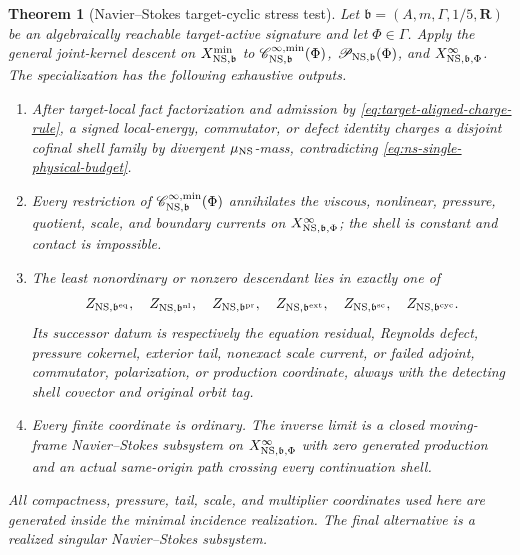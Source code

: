 \documentclass[11pt]{article}
\numberwithin{section}{part}
\theoremstyle{plain}
\newtheorem{theorem}{Theorem}[section]
\theoremstyle{definition}
\theoremstyle{remark}
\begin{document}
\begin{theorem}[Navier--Stokes target-cyclic stress test]
\label{thm:ns-target-cyclic-stress-test}
Let \(\mathfrak b=(A,m,\Gamma,1/5,\mathbf R)\) be an algebraically reachable
target-active signature and let \(\Phi\in\Gamma\).
Apply the general joint-kernel descent on
\(X^{\min}_{{\rm NS},\mathfrak b}\) to
\(\mathscr C^{\infty,\min}_{{\rm NS},\mathfrak b}(\Phi)\),
\(\mathscr P_{{\rm NS},\mathfrak b}(\Phi)\), and
\(X^\infty_{{\rm NS},\mathfrak b,\Phi}\).  The specialization has the following
exhaustive outputs.
\begin{enumerate}[label=\textup{(S\arabic*)}]
\item After target-local fact factorization and admission by
\eqref{eq:target-aligned-charge-rule}, a signed local-energy, commutator, or
defect identity charges a disjoint cofinal shell family by divergent
\(\mu_{\rm NS}\)-mass, contradicting
\eqref{eq:ns-single-physical-budget}.
\item Every restriction of
\(\mathscr C^{\infty,\min}_{{\rm NS},\mathfrak b}(\Phi)\) annihilates the viscous, nonlinear,
pressure, quotient, scale, and boundary currents on
\(X^\infty_{{\rm NS},\mathfrak b,\Phi}\); the shell is constant and contact is impossible.
\item The least nonordinary or nonzero descendant lies in exactly one of
\[
 Z_{{\rm NS},\mathfrak b^{\rm eq}},\quad
 Z_{{\rm NS},\mathfrak b^{\rm nl}},\quad
 Z_{{\rm NS},\mathfrak b^{\rm pr}},\quad
 Z_{{\rm NS},\mathfrak b^{\rm ext}},\quad
 Z_{{\rm NS},\mathfrak b^{\rm sc}},\quad
 Z_{{\rm NS},\mathfrak b^{\rm cyc}}.
\]
Its successor datum is respectively the equation residual, Reynolds defect,
pressure cokernel, exterior tail, nonexact scale current, or failed adjoint,
commutator, polarization, or production coordinate, always with the detecting
shell covector and original orbit tag.
\item Every finite coordinate is ordinary.  The inverse limit is a closed
moving-frame Navier--Stokes subsystem on
\(X^\infty_{{\rm NS},\mathfrak b,\Phi}\) with zero generated production and an actual
same-origin path crossing every continuation shell.
\end{enumerate}
All compactness, pressure, tail, scale, and multiplier coordinates used here
are generated inside the minimal incidence realization.  The final
alternative is a realized singular Navier--Stokes subsystem.
\end{theorem}
\end{document}
